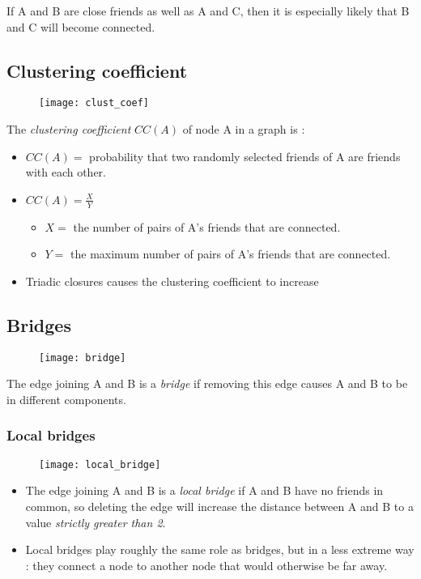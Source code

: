 If A and B are close friends as well as A and C, then it is especially likely that B and C will become connected.

\subsection{Clustering coefficient}

\begin{figure}[H]
    \centering
    \texttt{[image: clust\_coef]}
\end{figure}

The \textit{clustering coefficient} $CC(A)$ of node A in a graph is :
\begin{itemize}
\item $CC(A) =$ probability that two randomly selected friends of A are friends with each other.
\item $CC(A) = \frac{X}{Y}$
	\begin{itemize}
	\item $X =$ the number of pairs of A's friends that are connected.
	\item $Y =$ the maximum number of pairs of A's friends that are connected.
	\end{itemize}
\item Triadic closures causes the clustering coefficient to increase
\end{itemize}

\subsection{Bridges}

\begin{figure}[H]
    \centering
    \texttt{[image: bridge]}
\end{figure}

The edge joining A and B is a \textit{bridge} if removing this edge causes A and B to be in different components.

\subsubsection{Local bridges}

\begin{figure}[H]
    \centering
    \texttt{[image: local\_bridge]}
\end{figure}

\begin{itemize}
\item The edge joining A and B is a \textit{local bridge} if A and B have no friends in common, so deleting the edge will increase the distance between A and B to a value \textit{strictly greater than 2}.
\item Local bridges play roughly the same role as bridges, but in a less extreme way : they connect a node to another node that would otherwise be far away.
\end{itemize}

